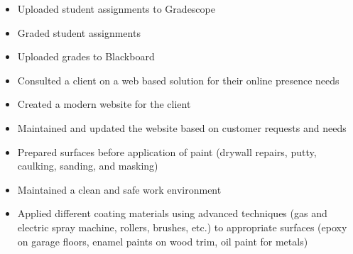 \documentclass[10pt,a4paper,ragged2e,withhyper]{altacv}
\begin{document}

    \makecvheader



    \begin{paracol}{2}


      \begin{itemize}
          \item Uploaded student assignments to Gradescope
          \item Graded student assignments 
          \item Uploaded grades to Blackboard
      \end{itemize}

      \begin{itemize}
          \item Consulted a client on a web based solution for their online presence needs
          \item Created a modern website for the client
          \item Maintained and updated the website based on customer requests and needs
      \end{itemize}

      \begin{itemize}
        \item Prepared surfaces before application of paint (drywall repairs, putty, caulking, sanding, and masking)
        \item Maintained a clean and safe work environment
        \item Applied different coating materials using advanced techniques (gas and electric spray machine, rollers, brushes, etc.) to appropriate surfaces (epoxy on garage floors, enamel paints on wood trim, oil paint for metals)
      \end{itemize}


\end{paracol}
\end{document}
